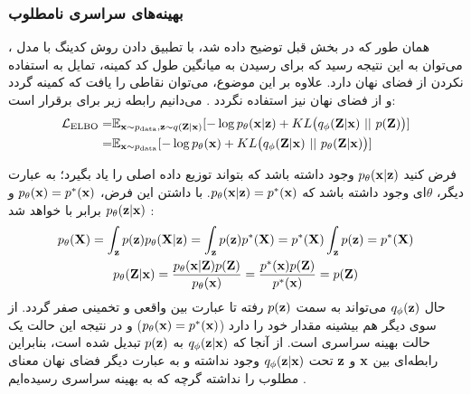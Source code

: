 \subsubsection{بهینه‌های سراسری نامطلوب}
همان ‌طور که در بخش قبل توضیح داده شد، با تطبیق دادن روش کدینگ   با مدل \vae{}، می‌توان به این نتیجه رسید که \decoder{} برای رسیدن به میانگین طول کد کمینه، تمایل به استفاده نکردن از فضای نهان دارد. علاوه بر این موضوع، می‌توان نقاطی را یافت که  کمینه گردد و از فضای نهان نیز استفاده نگردد \cite{infovae}. می‌دانیم رابطه زیر برای  برقرار است:
\begin{align}
	\mathcal{L}_{\text{ELBO}} = & \mathbb E_{{\bf x} \sim p_\text{data}, {\bf z} \sim q({\bf Z}|{\bf x})} [- \log p_\theta({\bf x}|{\bf z}) + KL\big(q_\phi({\bf Z}|{\bf x}) ~ || ~ p({\bf Z})\big)] \nonumber
	\\
	=                           & \mathbb E_{{\bf x} \sim p_\text{data}} [-\log p_\theta({\bf x}) + KL\big(q_\phi({\bf Z}|{\bf x}) ~||~ p_\theta({\bf Z}|{\bf x})\big)] \nonumber
\end{align}

فرض کنید $p_\theta({\bf x}|{\bf z})$ وجود داشته باشد که بتواند توزیع داده اصلی را یاد بگیرد؛ به عبارت دیگر، $\theta$ای وجود داشته باشد که $p_\theta({\bf x}|{\bf z}) = p^*({\bf x})$. با داشتن این فرض،
$p_\theta({\bf x}) = p^*({\bf x})$
و
$p_\theta({\bf z}|{\bf x})$
برابر با \priordist{} خواهد شد \cite{infovae}:
\begin{gather}
	p_\theta({\bf X}) = \int_{\bf z} p({\bf z}) p_\theta({\bf X}|{\bf z})  = \int_{\bf z} p({\bf z}) p^*({\bf X}) = p^*({\bf X}) \int_{\bf z} p({\bf z}) = p^*({\bf X})
	\\
	p_\theta({\bf Z}|{\bf x}) = \frac{p_\theta({\bf x}|{\bf Z}) p({\bf Z})}{p_\theta({\bf x})} = \frac{p^*({\bf x}) p({\bf Z})}{p^*({\bf x})} = p({\bf Z})
\end{gather}
حال $q_\phi({\bf z})$ می‌تواند به سمت $p({\bf z})$ رفته تا عبارت  بین \posterior{} واقعی و تخمینی صفر گردد. از سوی دیگر هم \likelihood{} بیشینه مقدار خود را دارد ($p_\theta({\bf x}) = p^*({\bf x})$) و در نتیجه این حالت یک حالت بهینه سراسری است. از آنجا که $q_\phi({\bf z}|{\bf x})$ به $p({\bf z})$ تبدیل شده است، بنابراین رابطه‌ای بین ${\bf x}$ و ${\bf z}$ تحت $q_\phi({\bf z}|{\bf x})$ وجود نداشته و به عبارت دیگر فضای نهان معنای مطلوب را نداشته گرچه که به بهینه سراسری رسیده‌ایم \cite{infovae}.


